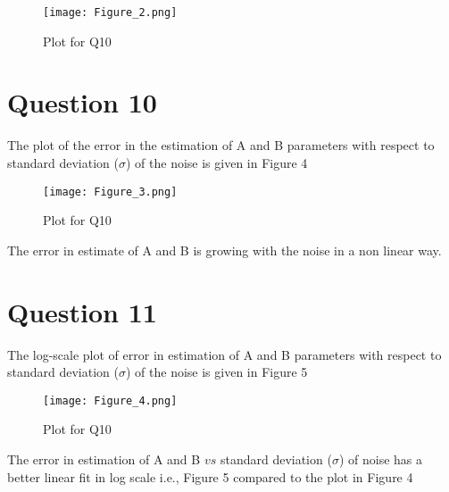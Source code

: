 \documentclass[12pt, a4paper]{report}
\begin{document}
\begin{figure}[H]
	\centering
	\texttt{[image: Figure\_2.png]}  %
	\caption{Plot for Q10}
	\label{fig:sample}
\end{figure} 

\section*{Question 10}

The plot of the error in the estimation of A and B parameters with respect to standard deviation ($\sigma$) of the noise is given in Figure 4

\begin{figure}[H]
	\centering
	\texttt{[image: Figure\_3.png]}  %
	\caption{Plot for Q10}
	\label{fig:sample}
\end{figure} 

The error in estimate of A and B is growing with the noise in a non linear way.

\section*{Question 11}
The log-scale plot of error in estimation of A and B parameters with respect to standard deviation ($\sigma$) of the noise is given in Figure 5

\begin{figure}[H]
	\centering
	\texttt{[image: Figure\_4.png]}  %
	\caption{Plot for Q10}
	\label{fig:sample}
\end{figure} 

The error in estimation of A and B $vs$ standard deviation ($\sigma$) of noise has a better linear fit in log scale i.e., Figure 5 compared to the plot in Figure 4
\end{document}

